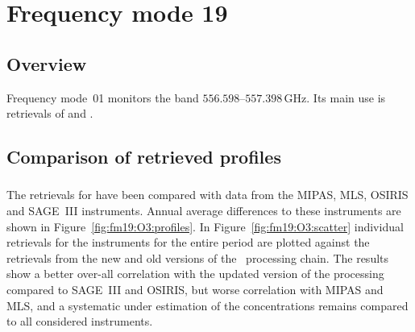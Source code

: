 \section{Frequency mode 19}
\label{sec:fm19}

\subsection{Overview}
\label{sec:fm19:overview}
Frequency mode~01 monitors the band $556.598$--$557.398\,\mathrm{GHz}$. Its
main use is retrievals of  and .


\subsection{Comparison of retrieved profiles}
\label{sec:fm19:comparison}



\subsubsection{}
\label{sec:fm19:comparison:O3}
The retrievals for  have been compared with data from the MIPAS, MLS,
OSIRIS and SAGE~III instruments. Annual average differences to these
instruments are shown in Figure~\ref{fig:fm19:O3:profiles}. In
Figure~\ref{fig:fm19:O3:scatter} individual retrievals for the instruments for
the entire period are plotted against the retrievals from the new and old
versions of the \smr\ processing chain. The results show a better over-all
correlation with the updated version of the processing compared to SAGE~III and
OSIRIS, but worse correlation with MIPAS and MLS, and a systematic under
estimation of the concentrations remains compared to all considered
instruments.

